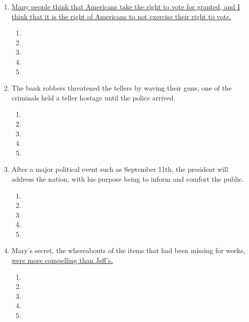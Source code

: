 \begin{enumerate}
\bigskip
\item \ul{Many people think that Americans take the right to vote for granted, and I think that it is the right of Americans to not exercise their right to vote.}

\bigskip
\begin{enumerate}[label=(\Alph*)]
\item\hrulefill
\item\hrulefill
\item\hrulefill
\item\hrulefill
\item\hrulefill
\end{enumerate}

\bigskip
\item The bank robbers threatened the tellers by waving their guns, one of the criminals held a teller hostage until the police arrived. 

\bigskip
\begin{enumerate}[label=(\Alph*)]
\item\hrulefill
\item\hrulefill
\item\hrulefill
\item\hrulefill
\item\hrulefill
\end{enumerate}

\bigskip
\item After a major political event such as September 11th, the president will address the nation, with his purpose being to inform and comfort the public.

\bigskip
\begin{enumerate}[label=(\Alph*)]
\item\hrulefill
\item\hrulefill
\item\hrulefill
\item\hrulefill
\item\hrulefill
\end{enumerate}

\bigskip
\item Mary's secret, the whereabouts of the items that had been missing for weeks, \ul{were more compelling than Jeff's.}

\bigskip
\begin{enumerate}[label=(\Alph*)]
\item\hrulefill
\item\hrulefill
\item\hrulefill
\item\hrulefill
\item\hrulefill
\end{enumerate}
\end{enumerate}
